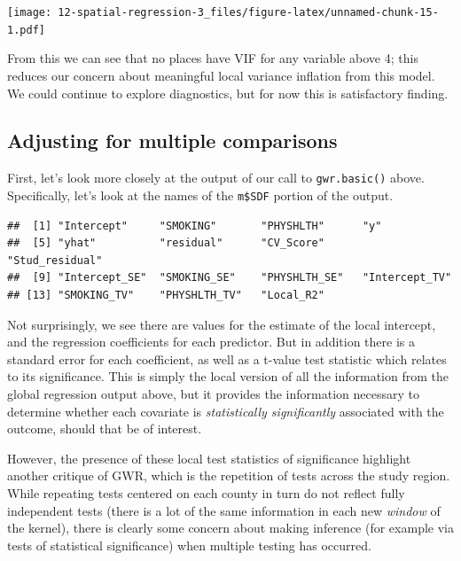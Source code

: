 \documentclass[
]{book}
\newenvironment{Shaded}{\begin{snugshade}}{\end{snugshade}}
\newcommand{\FunctionTok}[1]{\textcolor[rgb]{0.00,0.00,0.00}{#1}}
\newcommand{\NormalTok}[1]{#1}
\newcommand{\SpecialCharTok}[1]{\textcolor[rgb]{0.00,0.00,0.00}{#1}}
\begin{document}
\texttt{[image: 12-spatial-regression-3\_files/figure-latex/unnamed-chunk-15-1.pdf]}

From this we can see that no places have VIF for any variable above 4; this reduces our concern about meaningful local variance inflation from this model. We could continue to explore diagnostics, but for now this is satisfactory finding.

\hypertarget{adjusting-for-multiple-comparisons}{%
\subsection{Adjusting for multiple comparisons}\label{adjusting-for-multiple-comparisons}}

First, let's look more closely at the output of our call to \texttt{gwr.basic()} above. Specifically, let's look at the names of the \texttt{m\$SDF} portion of the output.

\begin{Shaded}
\end{Shaded}

\begin{verbatim}
##  [1] "Intercept"     "SMOKING"       "PHYSHLTH"      "y"            
##  [5] "yhat"          "residual"      "CV_Score"      "Stud_residual"
##  [9] "Intercept_SE"  "SMOKING_SE"    "PHYSHLTH_SE"   "Intercept_TV" 
## [13] "SMOKING_TV"    "PHYSHLTH_TV"   "Local_R2"
\end{verbatim}

Not surprisingly, we see there are values for the estimate of the local intercept, and the regression coefficients for each predictor. But in addition there is a standard error for each coefficient, as well as a t-value test statistic which relates to its significance. This is simply the local version of all the information from the global regression output above, but it provides the information necessary to determine whether each covariate is \emph{statistically significantly} associated with the outcome, should that be of interest.

However, the presence of these local test statistics of significance highlight another critique of GWR, which is the repetition of tests across the study region. While repeating tests centered on each county in turn do not reflect fully independent tests (there is a lot of the same information in each new \emph{window} of the kernel), there is clearly some concern about making inference (for example via tests of statistical significance) when multiple testing has occurred.
\end{document}
